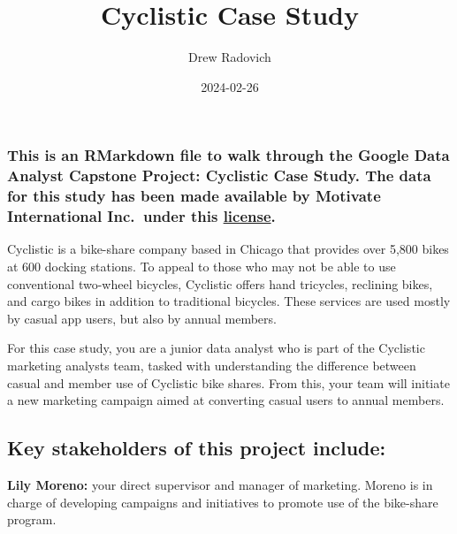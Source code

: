 \documentclass[
]{article}
\title{Cyclistic Case Study}
\author{Drew Radovich}
\date{2024-02-26}
\begin{document}
\maketitle

\hypertarget{this-is-an-rmarkdown-file-to-walk-through-the-google-data-analyst-capstone-project-cyclistic-case-study.-the-data-for-this-study-has-been-made-available-by-motivate-international-inc.-under-this-license.}{%
\subsubsection{\texorpdfstring{\textbf{This is an RMarkdown file to walk
through the Google Data Analyst Capstone Project: Cyclistic Case Study.
The data for this study has been made available by Motivate
International Inc.~under this
\href{https://divvy-tripdata.s3.amazonaws.com/index.html}{license}.}}{This is an RMarkdown file to walk through the Google Data Analyst Capstone Project: Cyclistic Case Study. The data for this study has been made available by Motivate International Inc.~under this license.}}\label{this-is-an-rmarkdown-file-to-walk-through-the-google-data-analyst-capstone-project-cyclistic-case-study.-the-data-for-this-study-has-been-made-available-by-motivate-international-inc.-under-this-license.}}

Cyclistic is a bike-share company based in Chicago that provides over
5,800 bikes at 600 docking stations. To appeal to those who may not be
able to use conventional two-wheel bicycles, Cyclistic offers hand
tricycles, reclining bikes, and cargo bikes in addition to traditional
bicycles. These services are used mostly by casual app users, but also
by annual members.

For this case study, you are a junior data analyst who is part of the
Cyclistic marketing analysts team, tasked with understanding the
difference between casual and member use of Cyclistic bike shares. From
this, your team will initiate a new marketing campaign aimed at
converting casual users to annual members.

\hypertarget{key-stakeholders-of-this-project-include}{%
\subsection{Key stakeholders of this project
include:}\label{key-stakeholders-of-this-project-include}}

\textbf{Lily Moreno:} your direct supervisor and manager of marketing.
Moreno is in charge of developing campaigns and initiatives to promote
use of the bike-share program.
\end{document}
